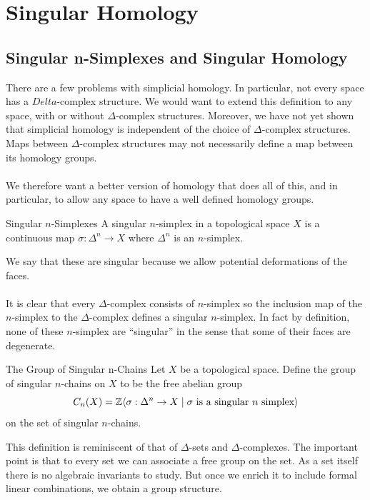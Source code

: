 \documentclass[a4paper]{article}
\begin{document}
\pagebreak
\section{Singular Homology}
\subsection{Singular n-Simplexes and Singular Homology}
There are a few problems with simplicial homology. In particular, not every space has a $Delta$-complex structure. We would want to extend this definition to any space, with or without $\Delta$-complex structures. Moreover, we have not yet shown that simplicial homology is independent of the choice of $\Delta$-complex structures. Maps between $\Delta$-complex structures may not necessarily define a map between its homology groups. \\~\\

We therefore want a better version of homology that does all of this, and in particular, to allow any space to have a well defined homology groups. 

\begin{defn}{Singular $n$-Simplexes}{} A singular $n$-simplex in a topological space $X$ is a continuous map $\sigma:\Delta^n\to X$ where $\Delta^n$ is an $n$-simplex. 
\end{defn}

We say that these are singular because we allow potential deformations of the faces. \\~\\

It is clear that every $\Delta$-complex consists of $n$-simplex so the inclusion map of the $n$-simplex to the $\Delta$-complex defines a singular $n$-simplex. In fact by definition, none of these $n$-simplex are ``singular'' in the sense that some of their faces are degenerate. 

\begin{defn}{The Group of Singular n-Chains}{} Let $X$ be a topological space. Define the group of singular $n$-chains on $X$ to be the free abelian group $$C_n(X)=\mathbb{Z}\langle\sigma:\Delta^n\to X\;|\;\sigma\text{ is a singular }n\text{ simplex}\rangle $$ on the set of singular $n$-chains. 
\end{defn}

This definition is reminiscent of that of $\Delta$-sets and $\Delta$-complexes. The important point is that to every set we can associate a free group on the set. As a set itself there is no algebraic invariants to study. But once we enrich it to include formal linear combinations, we obtain a group structure. 
\end{document}
